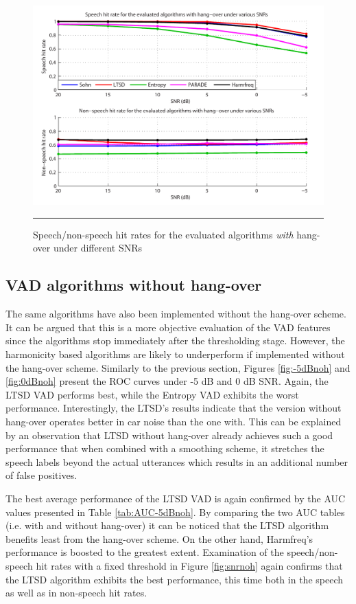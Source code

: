 \begin{figure}[htbp]
	\centering
		\includegraphics[width=0.9\columnwidth]{Figures/Chapter4/snrhbold.pdf}
		\rule{37em}{0.5pt}
	\caption[Speech/non-speech hit rates for the evaluated algorithms \emph{with} hang-over under different SNRs]{Speech/non-speech hit rates for the evaluated algorithms \emph{with} hang-over under different SNRs}
	\label{fig:snrh}
\end{figure}

\subsection{VAD algorithms without hang-over}

The same algorithms have also been implemented without the hang-over scheme. It can be argued that this is a more objective evaluation of the VAD features since the algorithms stop immediately after the thresholding stage. However, the harmonicity based algorithms are likely to underperform if implemented without the hang-over scheme. Similarly to the previous section, Figures \ref{fig:-5dBnoh} and \ref{fig:0dBnoh} present the ROC curves under -5 dB and 0 dB SNR. Again, the LTSD VAD performs best, while the Entropy VAD exhibits the worst performance. Interestingly, the LTSD's results indicate that the version without hang-over operates better in car noise than the one with. This can be explained by an observation that LTSD without hang-over already achieves such a good performance that when combined with a smoothing scheme, it stretches the speech labels beyond the actual utterances which results in an additional number of false positives.

The best average performance of the LTSD VAD is again confirmed by the AUC values presented in Table \ref{tab:AUC-5dBnoh}. By comparing the two AUC tables (i.e. with and without hang-over) it can be noticed that the LTSD algorithm benefits least from the hang-over scheme. On the other hand, Harmfreq's performance is boosted to the greatest extent. Examination of the speech/non-speech hit rates with a fixed threshold in Figure \ref{fig:snrnoh} again confirms that the LTSD algorithm exhibits the best performance, this time both in the speech as well as in non-speech hit rates.

